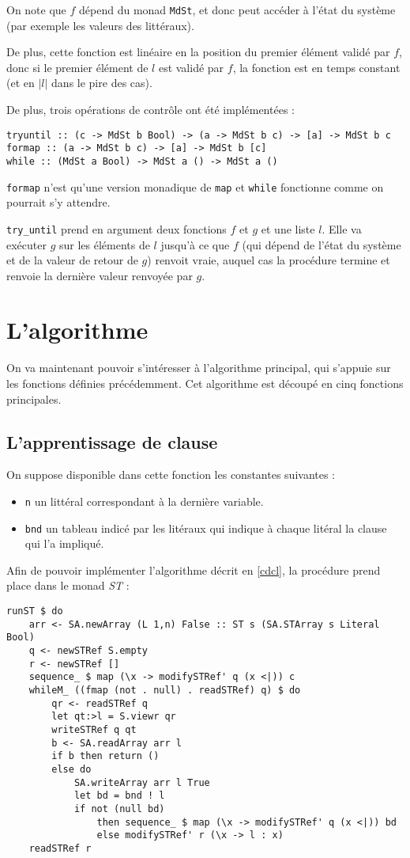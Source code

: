 On note que $f$ dépend du monad \texttt{MdSt}, et donc peut accéder à l'état
du système (par exemple les valeurs des littéraux).

De plus, cette fonction est linéaire en la position du premier élément validé
par $f$, donc si le premier élément de $l$ est validé par $f$, la fonction est
en temps constant (et en $|l|$ dans le pire des cas).

De plus, trois opérations de contrôle ont été implémentées :
\begin{lstlisting}
tryuntil :: (c -> MdSt b Bool) -> (a -> MdSt b c) -> [a] -> MdSt b c
formap :: (a -> MdSt b c) -> [a] -> MdSt b [c]
while :: (MdSt a Bool) -> MdSt a () -> MdSt a ()
\end{lstlisting}

\texttt{formap} n'est qu'une version monadique de \texttt{map} et
\texttt{while} fonctionne comme on pourrait s'y attendre.

\texttt{try\_until} prend en argument deux fonctions $f$ et $g$ et une liste
$l$. Elle va exécuter $g$ sur les éléments de $l$ jusqu'à ce que $f$ (qui
dépend de l'état du système et de la valeur de retour de $g$) renvoit
vraie, auquel cas la procédure termine et renvoie la dernière valeur
renvoyée par $g$.

\section{L'algorithme}
On va maintenant pouvoir s'intéresser à l'algorithme principal, qui s'appuie
sur les fonctions définies précédemment. Cet algorithme est découpé en cinq
fonctions principales.

\subsection{L'apprentissage de clause}
On suppose disponible dans cette fonction les constantes suivantes :
\begin{itemize}
    \item \texttt{n} un littéral correspondant à la dernière variable.
    \item \texttt{bnd} un tableau indicé par les litéraux qui indique à chaque
        litéral la clause qui l'a impliqué.
\end{itemize}

Afin de pouvoir implémenter l'algorithme décrit en \ref{cdcl}, la procédure
prend place dans le monad \emph{ST} :
\begin{lstlisting}
runST $ do
    arr <- SA.newArray (L 1,n) False :: ST s (SA.STArray s Literal Bool)
    q <- newSTRef S.empty
    r <- newSTRef []
    sequence_ $ map (\x -> modifySTRef' q (x <|)) c
    whileM_ ((fmap (not . null) . readSTRef) q) $ do
        qr <- readSTRef q
        let qt:>l = S.viewr qr
        writeSTRef q qt
        b <- SA.readArray arr l
        if b then return ()
        else do
            SA.writeArray arr l True
            let bd = bnd ! l
            if not (null bd)
                then sequence_ $ map (\x -> modifySTRef' q (x <|)) bd
                else modifySTRef' r (\x -> l : x)
    readSTRef r
\end{lstlisting}

